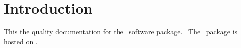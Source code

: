 \documentclass{article}
\begin{document}

\tableofcontents

% 

\clearpage
\pagestyle{long}


\graphicspath{{uml/}{latex/}}

\section{Introduction}\label{introduction}

This the quality documentation for the \packagename\ software package.
\packagedescription\ The \packagename\ package is hosted on \packageurl.
\end{document}
